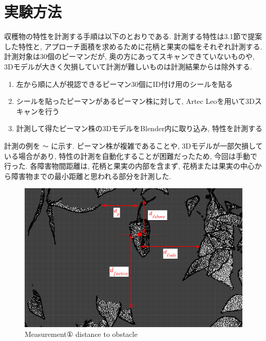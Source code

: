 \section{実験方法}
収穫物の特性を計測する手順は以下のとおりである.
計測する特性は3.1節で提案した特性と, アプローチ面積を求めるために花柄と果実の幅をそれぞれ計測する.
計測対象は30個のピーマンだが, 奥の方にあってスキャンできていないものや, 3Dモデルが大きく欠損していて計測が難しいものは計測結果からは除外する.

\begin{enumerate}
  \item 左から順に人が視認できるピーマン30個にID付け用のシールを貼る
  \item シールを貼ったピーマンがあるピーマン株に対して, Artec Leoを用いて3Dスキャンを行う
  \item 計測して得たピーマン株の3DモデルをBlender内に取り込み, 特性を計測する
\end{enumerate}

計測の例を  \verb|〜|  に示す. 
ピーマン株が複雑であることや, 3Dモデルが一部欠損している場合があり, 特性の計測を自動化することが困難だったため, 今回は手動で行った.
各障害物間距離は, 花柄と果実の内部を含まず, 花柄または果実の中心から障害物までの最小距離と思われる部分を計測した.

\vspace{5mm}
\begin{figure}[H]
     \centering
     \includegraphics[width=\columnwidth]{images/png/measurement1.png}
     \caption{Measurement① distance to obstacle}
     \label{Fig:measurement1}
\end{figure}

